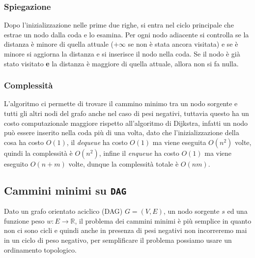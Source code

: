         \subsubsection{Spiegazione}
            Dopo l'inizializzazione nelle prime due righe, si entra nel ciclo principale che estrae un nodo dalla coda e lo esamina. Per ogni nodo adiacente si controlla se la distanza è minore di quella attuale ($+\infty$ se non è stata ancora visitata) e se è minore si aggiorna la distanza e si inserisce il nodo nella coda. Se il nodo è già stato visitato \textbf{e} la distanza è maggiore di quella attuale, allora non si fa nulla.
        \subsubsection{Complessità}
            L'algoritmo ci permette di trovare il cammino minimo tra un nodo sorgente e tutti gli altri nodi del grafo anche nel caso di pesi negativi, tuttavia questo ha un costo computazionale maggiore rispetto all'algoritmo di Dijkstra, infatti un nodo può essere inserito nella coda più di una volta, dato che l'inizializzazione della cosa ha costo $O(1)$, il \textit{dequeue} ha costo $O(1)$ ma viene eseguita $O(n^2)$ volte, quindi la complessità è $O(n^2)$, infine il \textit{enqueue} ha costo $O(1)$ ma viene eseguito $O(n+m)$ volte, dunque la complessità totale è $O(nm)$.
    \subsection{Cammini minimi su \texttt{DAG}}
        Dato un grafo orientato aciclico (DAG) $G=(V,E)$, un nodo sorgente $s$ ed una funzione peso $w: E \rightarrow \mathbb{R}$, il problema dei cammini minimi è più semplice in quanto non ci sono cicli e quindi anche in presenza di pesi negativi non incorreremo mai in un ciclo di peso negativo, per semplificare il problema possiamo usare un ordinamento topologico.
